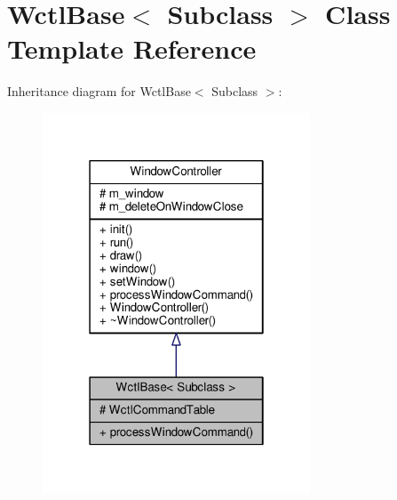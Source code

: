 \hypertarget{classWctlBase}{}\section{Wctl\+Base$<$ Subclass $>$ Class Template Reference}
\label{classWctlBase}


Inheritance diagram for Wctl\+Base$<$ Subclass $>$\+:
\nopagebreak
\begin{figure}[H]
\begin{center}
\leavevmode
\includegraphics[width=226pt]{d1/d50/classWctlBase__inherit__graph}
\end{center}
\end{figure}


